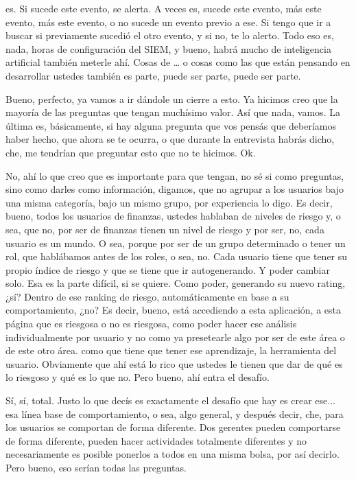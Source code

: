 \begin{description}[leftmargin=0cm, labelsep=0.5cm]
es. Si sucede este evento, se alerta. A veces es, sucede este evento, más este evento, más este evento, o no sucede un evento previo a ese. Si tengo que ir a buscar si previamente sucedió el otro evento, y si no, te lo alerto. Todo eso es, nada, horas de configuración del SIEM, y bueno, habrá mucho de inteligencia artificial también meterle ahí. Cosas de … o cosas como las que están pensando en desarrollar ustedes también es parte, puede ser parte, puede ser parte.

    \item[\textbf{MUNTAABSKI FEDERICO:}] Bueno, perfecto, ya vamos a ir dándole un cierre a esto. Ya hicimos creo que la mayoría de las preguntas que tengan muchísimo valor. Así que nada, vamos. La última es, básicamente, si hay alguna pregunta que vos pensás que deberíamos haber hecho, que ahora se te ocurra, o que durante la entrevista habrás dicho, che, me tendrían que preguntar esto que no te hicimos. Ok.

    \item[\textbf{JACUBOVICH LUCIANA:}] No, ahí lo que creo que es importante para que tengan, no sé si como preguntas, sino como darles como información, digamos, que no agrupar a los usuarios bajo una misma categoría, bajo un mismo grupo, por experiencia lo digo. Es decir, bueno, todos los usuarios de finanzas, ustedes hablaban de niveles de riesgo y, o sea, que no, por ser de finanzas tienen un nivel de riesgo y por ser, no, cada usuario es un mundo. O sea, porque por ser de un grupo determinado o tener un rol, que hablábamos antes de los roles, o sea, no. Cada usuario tiene que tener su propio índice de riesgo y que se tiene que ir autogenerando. Y poder cambiar solo. Esa es la parte difícil, si se quiere. Como poder, generando su nuevo rating, ¿sí? Dentro de ese ranking de riesgo, automáticamente en base a su comportamiento, ¿no? Es decir, bueno, está accediendo a esta aplicación, a esta página que es riesgosa o no es riesgosa, como poder hacer ese análisis individualmente por usuario y no como ya presetearle algo por ser de este área o de este otro área. como que tiene que tener ese aprendizaje, la herramienta del usuario. Obviamente que ahí está lo rico que ustedes le tienen que dar de qué es lo riesgoso y qué es lo que no. Pero bueno, ahí entra el desafío.

    \item[\textbf{MUNTAABSKI FEDERICO:}] Sí, sí, total. Justo lo que decís es exactamente el desafío que hay es crear ese... esa línea base de comportamiento, o sea, algo general, y después decir, che, para los usuarios se comportan de forma diferente. Dos gerentes pueden comportarse de forma diferente, pueden hacer actividades totalmente diferentes y no necesariamente es posible ponerlos a todos en una misma bolsa, por así decirlo. Pero bueno, eso serían todas las preguntas.


\end{description}
